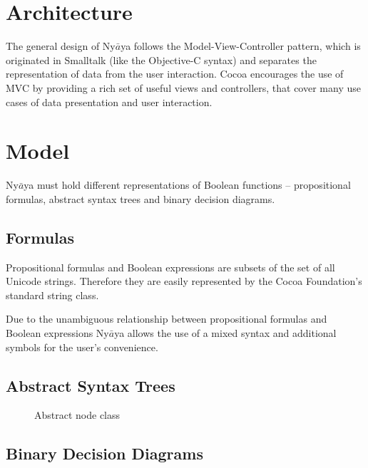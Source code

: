 
\section{Architecture}

The general design of Ny$\bar{a}$ya follows the Model-View-Controller pattern,
which is originated in Smalltalk \cite[p.4]{GAMMAETAL} (like the Objective-C syntax)
and separates the representation of data from the user interaction.
Cocoa  encourages the use of MVC by providing a rich set of useful views and controllers,
that cover many use cases of data presentation and user interaction. 

\section{Model}

Ny$\bar{a}$ya must hold different representations of Boolean functions – propositional formulas, abstract syntax trees and binary decision diagrams. 

\subsection{Formulas}
Propositional formulas and Boolean expressions are subsets of the set of all Unicode strings. 
Therefore they are easily represented by the Cocoa Foundation's  
standard string class. 

Due to the unambiguous relationship between propositional formulas and Boolean expressions Ny$\bar{a}$ya allows the use of a mixed syntax and additional symbols for the user's convenience. 


\subsection{Abstract Syntax Trees}

\begin{figure}[htbp]
\begin{center}
\caption{Abstract node class}
\label{fig:NyayaNodeCluster}
\end{center}
\end{figure}

\subsection{Binary Decision Diagrams}

